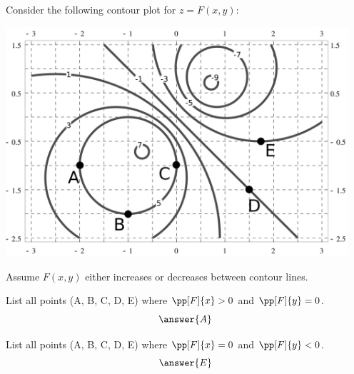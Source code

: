 \documentclass{ximera}
\author{Bart Snapp}
\begin{document}
\begin{exercise}
Consider the following contour plot for $z=F(x,y)$:
\begin{image}
\includegraphics[width=5in]{contours1.png}
\end{image}
Assume $F(x,y)$ either increases or decreases between contour lines.

List all points (\textsf{A}, \textsf{B}, \textsf{C}, \textsf{D},
\textsf{E}) where $\pp[F]{x}>0$ and $\pp[F]{y}=0$.
\[
\answer{A}
\]

  
List all points (\textsf{A}, \textsf{B}, \textsf{C}, \textsf{D},
\textsf{E}) where $\pp[F]{x}=0$ and $\pp[F]{y}<0$.
\[
\answer{E}
\]
\end{exercise}
\end{document}

